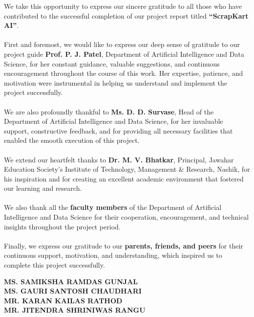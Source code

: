     We take this opportunity to express our sincere gratitude to all those who have contributed to the successful completion of our project report titled \textbf{ “ScrapKart AI”}.\\ \\
First and foremost, we would like to express our deep sense of gratitude to our project guide \textbf{Prof. P. J. Patel}, Department of Artificial Intelligence and Data Science, for her constant guidance, valuable suggestions, and continuous encouragement throughout the course of this work. Her expertise, patience, and motivation were instrumental in helping us understand and implement the project successfully. \\ \\
We are also profoundly thankful to \textbf{ Ms. D. D. Survase}, Head of the Department of \break Artificial Intelligence and Data Science, for her invaluable support, constructive feedback, and for providing all necessary facilities that enabled the smooth execution of this project. \\ \\
We extend our heartfelt thanks to \textbf{ Dr. M. V. Bhatkar}, Principal, Jawahar Education Society’s Institute of Technology, Management \& Research, Nashik, for his inspiration and for creating an excellent academic environment that fostered our learning and \break research. \\ \\
We also thank all the \textbf{ faculty members} of the Department of Artificial Intelligence and Data Science for their cooperation, encouragement, and technical insights throughout the project period. \\ \\
Finally, we express our gratitude to our \textbf{ parents, friends, and peers} for their continuous support, motivation, and understanding, which inspired us to complete this project successfully.

\begin{flushright}
\vspace{1.5cm}
\begin{minipage}{0.5\textwidth}
\begin{flushleft}
\textbf{MS. SAMIKSHA RAMDAS GUNJAL}\\[0.2cm]
\textbf{MS. GAURI SANTOSH CHAUDHARI}\\[0.2cm]
\textbf{MR. KARAN KAILAS RATHOD}\\[0.2cm]
\textbf{MR. JITENDRA SHRINIWAS RANGU}\\[0.2cm]
\end{flushleft}
\end{minipage}
\end{flushright}

